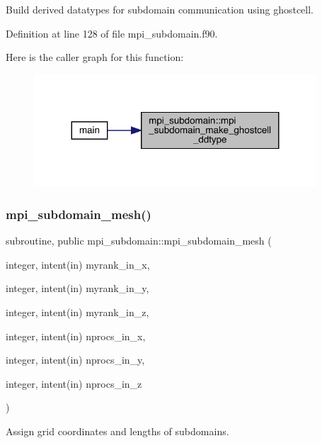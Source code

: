 Build derived datatypes for subdomain communication using ghostcell. 



Definition at line 128 of file mpi\+\_\+subdomain.\+f90.

Here is the caller graph for this function\+:
\nopagebreak
\begin{figure}[H]
\begin{center}
\leavevmode
\includegraphics[width=299pt]{namespacempi__subdomain_ad788c273d92ea7058caf0874bffdad6d_icgraph}
\end{center}
\end{figure}
\mbox{\label{namespacempi__subdomain_a612331eead74041f174ece9a572c7427}} 
\subsubsection{\texorpdfstring{mpi\_subdomain\_mesh()}{mpi\_subdomain\_mesh()}}
{\footnotesize\ttfamily subroutine, public mpi\+\_\+subdomain\+::mpi\+\_\+subdomain\+\_\+mesh (\begin{DoxyParamCaption}\item[{integer, intent(in)}]{myrank\+\_\+in\+\_\+x,  }\item[{integer, intent(in)}]{myrank\+\_\+in\+\_\+y,  }\item[{integer, intent(in)}]{myrank\+\_\+in\+\_\+z,  }\item[{integer, intent(in)}]{nprocs\+\_\+in\+\_\+x,  }\item[{integer, intent(in)}]{nprocs\+\_\+in\+\_\+y,  }\item[{integer, intent(in)}]{nprocs\+\_\+in\+\_\+z }\end{DoxyParamCaption})}



Assign grid coordinates and lengths of subdomains. 


